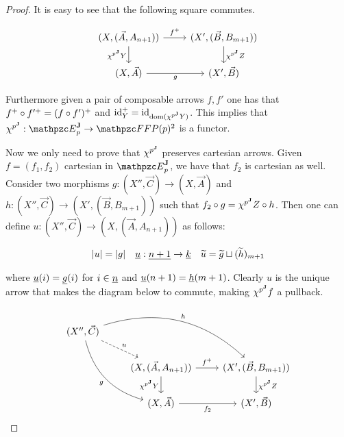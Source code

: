 \documentclass{lmcs} %
\theoremstyle{plain}\newtheorem{satz}[thm]{Satz} %
\begin{document}
			\begin{proof}
				It is easy to see that the following square commutes.
				
				\[\begin{tikzcd}
					{(X,(\vec{A}, A_{n+1}))} & {(X',(\vec{B}, B_{m+1}))} \\
					{(X,\vec{A})} & {(X',\vec{B})}
					\arrow["\carr{f}", from=1-1, to=1-2]
					\arrow["\JFC{p} Y"', from=1-1, to=2-1]
					\arrow["\JFC{p} Z", from=1-2, to=2-2]
					\arrow["g"', from=2-1, to=2-2]
				\end{tikzcd}\]
				
				Furthermore given a pair of composable arrows $f,f'$ one has that $\carr{f}\arcmp \carr{f'}=\carr{(f\arcmp f')}$ and $\carr{\id{Y}}=\id{\dom(\JFC{p} Y)}$. This implies that $\JFC{p}:\JDomE{p}\rightarrow \Arr{\FFFP{p}}$ is a functor. 
				
				Now we only need to prove that $\jcomp{\JFib{p}}$ preserves cartesian arrows. Given $f=(f_1,f_2)$ cartesian in $\JDomE{p}$, we have that $f_2$ is cartesian as well. Consider two morphisms $g:(X'',\vec{C})\rightarrow (X,\vec{A})$ and $h:(X'',\vec{C})\rightarrow (X', (\vec{B}, B_{m+1}))$ such that $f_2\arcmp g=\JFC{p} Z\arcmp h$.
				Then one can define $u:(X'', \vec{C})\rightarrow (X, (\vec{A}, A_{n+1}))$ as follows:
				
				\begin{align*}
					\fp{u} = \fp{g} &&
					\sp{u} : \num{n+1} \rightarrow \num{k} &&
					\tp{u} = \tp{g} \sqcup (\tp{h})_{m+1}
				\end{align*}
				
				where $\sp{u}(i)=\sp{g}(i)$ for $i\in \num{n}$ and $\sp{u}(n+1)= \sp{h}(m+1)$.
				Clearly $u$ is the unique arrow that makes the diagram below to commute, making $\JFC{p} f$ a pullback. 
				
				\[\begin{tikzcd}
					{(X'', \vec{C})} \\
					& {(X, (\vec{A}, A_{n+1}))} & {(X', (\vec{B}, B_{m+1}))} \\
					& {(X,\vec{A})} & {(X', \vec{B})}
					\arrow["u", dashed, from=1-1, to=2-2]
					\arrow["h", bend left, from=1-1, to=2-3]
					\arrow["g"', bend right, from=1-1, to=3-2]
					\arrow["{\carr{f}}", from=2-2, to=2-3]
					\arrow["{\JFC{p} Y}"', from=2-2, to=3-2]
					\arrow["{\JFC{p} Z}", from=2-3, to=3-3]
					\arrow["{f_2}"', from=3-2, to=3-3]
				\end{tikzcd}\] 
			\end{proof}
			
\end{document}
